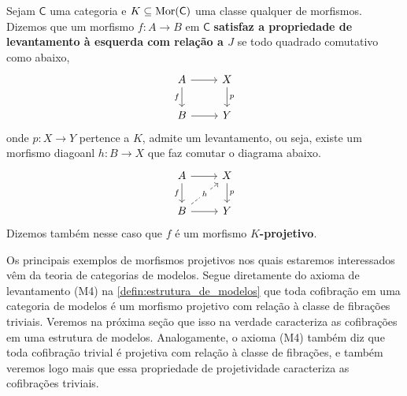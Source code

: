 \begin{defin}\label{defin:morfismo_proj}
  Sejam $\mathsf{C}$ uma categoria e $K \subseteq \mathrm{Mor}(\mathsf{C})$ uma classe qualquer de morfismos.
  Dizemos que um morfismo $f: A \to B$ em $\mathsf{C}$ \textbf{satisfaz a propriedade de levantamento à esquerda com relação a $J$} se todo quadrado comutativo como abaixo,
  \begin{displaymath}
    \begin{tikzcd}
      A
      \arrow[r]
      \arrow[d, "f" swap]
      & X
      \arrow[d, "p"]
      \\ B
      \arrow[r]
      & Y
    \end{tikzcd}
  \end{displaymath}
  onde $p: X \to Y$ pertence a $K$, admite um levantamento, ou seja, existe um morfismo diagoanl $h: B \to X$ que faz comutar o diagrama abaixo.
  \begin{displaymath}
    \begin{tikzcd}
      A
      \arrow[r]
      \arrow[d, "f" swap]
      & X
      \arrow[d, "p"]
      \\ B
      \arrow[r]
      \arrow[ru, dashed, "h" description]
      & Y
    \end{tikzcd}
  \end{displaymath}
  Dizemos também nesse caso que $f$ é um morfismo \textbf{$K$-projetivo}.
\end{defin}

\begin{exem}\label{exem:cofibs_sao_morfismos_proj}
  Os principais exemplos de morfismos projetivos nos quais estaremos interessados vêm da teoria de categorias de modelos.
  Segue diretamente do axioma de levantamento (M4) na \cref{defin:estrutura_de_modelos} que toda cofibração em uma categoria de modelos é um morfismo projetivo com relação à classe de fibrações triviais.
  Veremos na próxima seção que isso na verdade caracteriza as cofibrações em uma estrutura de modelos.
  Analogamente, o axioma (M4) também diz que toda cofibração trivial é projetiva com relação à classe de fibrações, e também veremos logo mais que essa propriedade de projetividade caracteriza as cofibrações triviais.
\end{exem}

